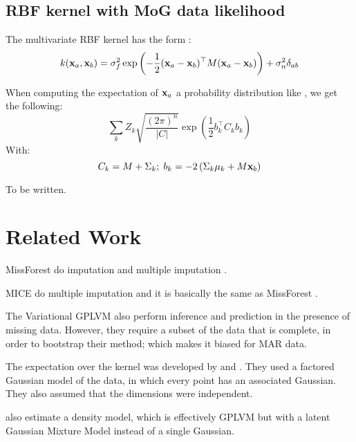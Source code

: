 \documentclass[letterpaper]{article}
\newcommand{\tp}{\top}
\newcommand{\vx}{{\bf x}}
\begin{document}
\subsection{\ac{RBF} kernel with \ac{MoG} data likelihood}
The multivariate \ac{RBF} kernel has the form \citep[Equation~5.1]{rasmussen2006gaussian}:
\begin{equation}
k(\vx_a, \vx_b) =  \sigma_f^2 \exp\left( -\frac{1}{2}(\vx_a - \vx_b)^\tp M
    (\vx_a - \vx_b) \right) + \sigma_n^2 \delta_{ab}
\label{eq:rbf-definition}
\end{equation}

When computing the expectation of $\vx_a$ a probability distribution like
, we get the following:
\begin{equation*}
  \sum_k Z_k \sqrt{\frac{(2\pi)^n}{|C|}} \exp\left( \frac{1}{2}b_k^\tp C_kb_k \right)
\end{equation*}
With:
\begin{equation*}
  C_k = M + \Sigma_k; \; b_k = -2\left(\Sigma_k\mu_k + M\vx_b \right)
\end{equation*}

To be written.

\section{Related Work}
MissForest do imputation and multiple imputation \citep{stekhoven2011missforest}.

MICE do multiple imputation and it is basically the same as MissForest
\citep{van1999flexible}.

The Variational \ac{GPLVM} \citep{damianou2016variational} also perform
inference and prediction in the presence of missing data. However, they require
a subset of the data that is complete, in order to bootstrap their method; which
makes it biased for MAR data.


The expectation over the kernel was developed by \citet{nebot2010kernel} and
\citet{hernandez2015study}. They used a factored Gaussian model of the data, in
which every point has an associated Gaussian. They also assumed that the
dimensions were independent.


\citet{iwata2012warped} also estimate a density model, which is effectively
\ac{GPLVM} but with a latent Gaussian Mixture Model instead of a single
Gaussian.
\end{document}
